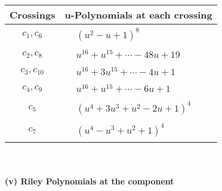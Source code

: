 \documentclass[1p]{elsarticle_modified}
\theoremstyle{definition}
\begin{document}
\begin{tabular}{m{50pt}|m{274pt}}
Crossings & \hspace{64pt}u-Polynomials at each crossing \\
\hline $$\begin{aligned}c_{1},c_{6}\end{aligned}$$&$\begin{aligned}
&(u^2- u+1)^8
\end{aligned}$\\
\hline $$\begin{aligned}c_{2},c_{8}\end{aligned}$$&$\begin{aligned}
&u^{16}+u^{15}+\cdots-48 u+19
\end{aligned}$\\
\hline $$\begin{aligned}c_{3},c_{10}\end{aligned}$$&$\begin{aligned}
&u^{16}+3 u^{15}+\cdots-4 u+1
\end{aligned}$\\
\hline $$\begin{aligned}c_{4},c_{9}\end{aligned}$$&$\begin{aligned}
&u^{16}+u^{15}+\cdots-6 u+1
\end{aligned}$\\
\hline $$\begin{aligned}c_{5}\end{aligned}$$&$\begin{aligned}
&(u^4+3 u^3+u^2-2 u+1)^4
\end{aligned}$\\
\hline $$\begin{aligned}c_{7}\end{aligned}$$&$\begin{aligned}
&(u^4- u^3+u^2+1)^4
\end{aligned}$\\
\hline
\end{tabular}\\~\\
\newpage\renewcommand{\arraystretch}{1}
\flushleft \textbf{(v) Riley Polynomials at the component}\newline \\
\end{document}
